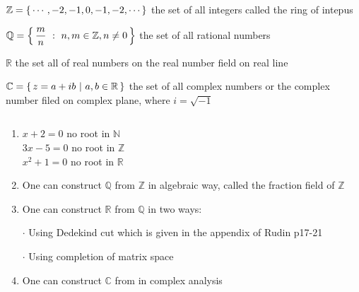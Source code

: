 $\mathbb{Z}=\left\{ \,\cdots,-2,-1,0,-1,-2,\cdots \,\right\}$ the set of all integers called the ring of intepus

$\mathbb{Q} = \left\{ \,\dfrac{m}{n}~:~n,m \in \mathbb{Z},n\neq 0 \,\right\}$ the set of all rational numbers %

$\mathbb{R}$ the set all of real numbers on the real number field on real line

$\mathbb{C} = \left\{ \,z=a+ib~|~a,b\in\mathbb{R} \,\right\}$ the set of all complex numbers or the complex number filed on complex plane, where $i = \sqrt{-1}$

 \begin{rmk*}$ $
 	\begin{tcolorbox}
 		\begin{enumerate}
 		\item $x + 2 = 0$ no root in $\mathbb{N}$\\$3x - 5 = 0$ no root in $\mathbb{Z}$\\$x^2 + 1 = 0$ no root in $\mathbb{R}$
 		\item One can construct $\mathbb{Q}$ from $\mathbb{Z}$ in algebraic way, called the fraction field of $\mathbb{Z}$
 		\item One can construct $\mathbb{R}$ from $\mathbb{Q}$ in two ways:
 		
 		$\cdot$ Using Dedekind cut which is given in the appendix of Rudin p17-21
 		
 		$\cdot$ Using completion of matrix space
 		\item One can construct $\mathbb{C}$ from in complex analysis
 	\end{enumerate}
 	\end{tcolorbox}
 	
 \end{rmk*}
 
 \newpage

